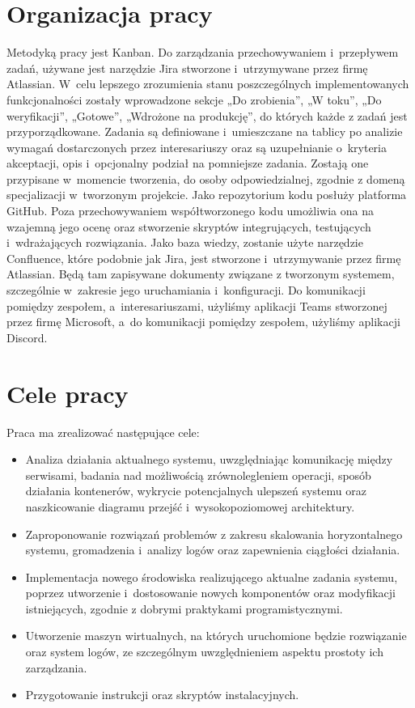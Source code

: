 \section{Organizacja pracy}
\indent Metodyką pracy jest Kanban. Do zarządzania przechowywaniem i~przepływem zadań, używane jest narzędzie Jira stworzone i~utrzymywane przez firmę Atlassian. W~celu lepszego zrozumienia stanu poszczególnych implementowanych funkcjonalności zostały wprowadzone sekcje „Do zrobienia”, „W toku”, „Do weryfikacji”, „Gotowe”, „Wdrożone na produkcję”, do których każde z zadań jest przyporządkowane. Zadania są definiowane i~umieszczane na tablicy po analizie wymagań dostarczonych przez interesariuszy oraz są uzupełnianie o~kryteria akceptacji, opis i~opcjonalny podział na pomniejsze zadania. Zostają one przypisane w~momencie tworzenia, do osoby odpowiedzialnej, zgodnie z domeną specjalizacji w~tworzonym projekcie.
\newline \indent Jako repozytorium kodu posłuży platforma GitHub. Poza przechowywaniem współtworzonego kodu umożliwia ona na wzajemną jego ocenę oraz stworzenie skryptów integrujących, testujących i~wdrażających rozwiązania.
\newline \indent Jako baza wiedzy, zostanie użyte narzędzie Confluence, które podobnie jak Jira, jest stworzone i~utrzymywanie przez firmę Atlassian. Będą tam zapisywane dokumenty związane z tworzonym systemem, szczególnie w~zakresie jego uruchamiania i~konfiguracji.
\newline \indent Do komunikacji pomiędzy zespołem, a~interesariuszami, użyliśmy aplikacji Teams stworzonej przez firmę Microsoft, a~do komunikacji pomiędzy zespołem, użyliśmy aplikacji Discord.

\section{Cele pracy}
\indent Praca ma zrealizować następujące cele:
\begin{itemize}
    \item Analiza działania aktualnego systemu, uwzględniając komunikację między serwisami, badania nad możliwością zrównolegleniem operacji, sposób działania kontenerów, wykrycie potencjalnych ulepszeń systemu oraz naszkicowanie diagramu przejść i~wysokopoziomowej architektury.
    \item Zaproponowanie rozwiązań problemów z zakresu skalowania horyzontalnego systemu, gromadzenia i~analizy logów oraz zapewnienia ciągłości działania.
    \item Implementacja nowego środowiska realizującego aktualne zadania systemu, poprzez utworzenie i~dostosowanie nowych komponentów oraz modyfikacji istniejących, zgodnie z dobrymi praktykami programistycznymi.
    \item Utworzenie maszyn wirtualnych, na których uruchomione będzie rozwiązanie oraz system logów, ze szczególnym uwzględnieniem aspektu prostoty ich zarządzania.
    \item Przygotowanie instrukcji oraz skryptów instalacyjnych.
\end{itemize}
